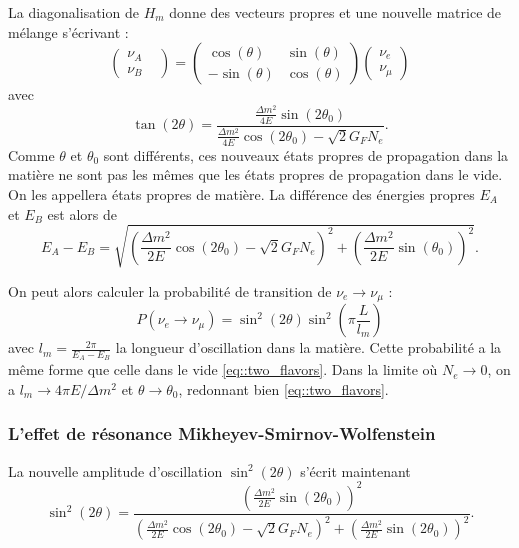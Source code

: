         La diagonalisation de $H_m$ donne des vecteurs propres et une nouvelle matrice de mélange s'écrivant :
        \begin{equation}
          \left(\begin{matrix}\nu_A & \\ \nu_B\end{matrix}\right) = \left(\begin{matrix}\cos(\theta) & \sin(\theta) \\ -\sin(\theta) & \cos(\theta)\end{matrix}\right)\left(\begin{matrix}\nu_e \\ \nu_{\mu}\end{matrix}\right)
        \end{equation}
        avec 
        \begin{equation}\label{eq::tan2theta}
          \tan(2\theta)=\frac{\frac{\Delta m^2}{4E}\sin(2\theta_0)}{\frac{\Delta m^2}{4E}\cos(2\theta_0)-\sqrt{2}G_F N_e}.
        \end{equation}
        Comme $\theta$ et $\theta_0$ sont différents, ces nouveaux états propres de propagation dans la matière ne sont pas les mêmes que les états propres de propagation dans le vide. On les appellera états propres de matière. La différence des énergies propres $E_A$ et $E_B$ est alors de 
        \begin{equation}
          E_A - E_B = \sqrt{\left(\frac{\Delta m^2}{2E}\cos(2\theta_0)-\sqrt{2}G_F N_e\right)^2 + \left(\frac{\Delta m^2}{2E}\sin(\theta_0)\right)^2}.
        \end{equation}
        
        On peut alors calculer la probabilité de transition de  $\nu_e\to\nu_{\mu}$ : 
        \begin{equation}\label{eq::two_flavors_matter}
          P(\nu_e\to\nu_{\mu}) = \sin^2(2\theta)\sin^2\left(\pi\frac{L}{l_m}\right)
        \end{equation}
        avec $l_m=\frac{2\pi}{E_A-E_B}$ la longueur d'oscillation dans la matière. Cette probabilité a la même forme que celle dans le vide \eqref{eq::two_flavors}. Dans la limite où $N_e\to 0$, on a $l_m\to 4\pi E/\Delta m^2$ et $\theta \to \theta_0$, redonnant bien \eqref{eq::two_flavors}.

      \subsubsection{L'effet de résonance Mikheyev-Smirnov-Wolfenstein}
        La nouvelle amplitude d'oscillation $\sin^2(2\theta)$ s'écrit maintenant
        \begin{equation}
          \sin^2(2\theta) = \frac{\left(\frac{\Delta m^2}{2E}\sin(2\theta_0)\right)^2}{\left(\frac{\Delta m^2}{2E}\cos(2\theta_0) - \sqrt{2}G_F N_e\right)^2 + \left(\frac{\Delta m^2}{2E}\sin(2\theta_0)\right)^2}.
        \end{equation}
        
